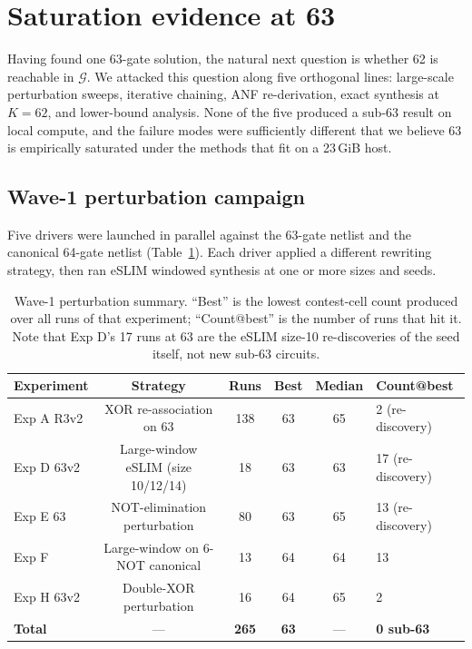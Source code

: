 \documentclass[11pt]{article}
\begin{document}
\FloatBarrier
\section{Saturation evidence at 63}
\label{sec:saturation}

Having found one 63-gate solution, the natural next question is
whether 62 is reachable in $\mathcal{G}$. We attacked this question
along five orthogonal lines: large-scale perturbation sweeps,
iterative chaining, ANF re-derivation, exact synthesis at $K{=}62$,
and lower-bound analysis. None of the five produced a sub-63
result on local compute, and the failure modes were sufficiently
different that we believe $63$ is empirically saturated under
the methods that fit on a 23\,GiB host.

\subsection{Wave-1 perturbation campaign}

Five drivers were launched in parallel against the 63-gate netlist
and the canonical 64-gate netlist
(Table~\ref{tab:perturbation}).
Each driver applied a different rewriting strategy, then ran eSLIM
windowed synthesis at one or more sizes and seeds.

\begin{table}[!t]
  \centering
  \caption{Wave-1 perturbation summary. ``Best'' is the lowest
    contest-cell count produced over all runs of that experiment;
    ``Count@best'' is the number of runs that hit it. Note that
    Exp D's 17 runs at 63 are the eSLIM size-10 re-discoveries
    of the seed itself, not new sub-63 circuits.}
  \label{tab:perturbation}
  \begin{tabular}{lccccl}
    \toprule
    Experiment & Strategy & Runs & Best & Median & Count@best \\
    \midrule
    Exp A R3v2 & XOR re-association on 63          & 138 & 63 & 65 & 2 (re-discovery) \\
    Exp D 63v2 & Large-window eSLIM (size 10/12/14) & 18  & 63 & 63 & 17 (re-discovery) \\
    Exp E 63   & NOT-elimination perturbation       & 80  & 63 & 65 & 13 (re-discovery) \\
    Exp F      & Large-window on 6-NOT canonical    & 13  & 64 & 64 & 13 \\
    Exp H 63v2 & Double-XOR perturbation            & 16  & 64 & 65 & 2 \\
    \midrule
    \textbf{Total} & --- & \textbf{265} & \textbf{63} & --- & \textbf{0 sub-63} \\
    \bottomrule
  \end{tabular}
\end{table}
\end{document}
